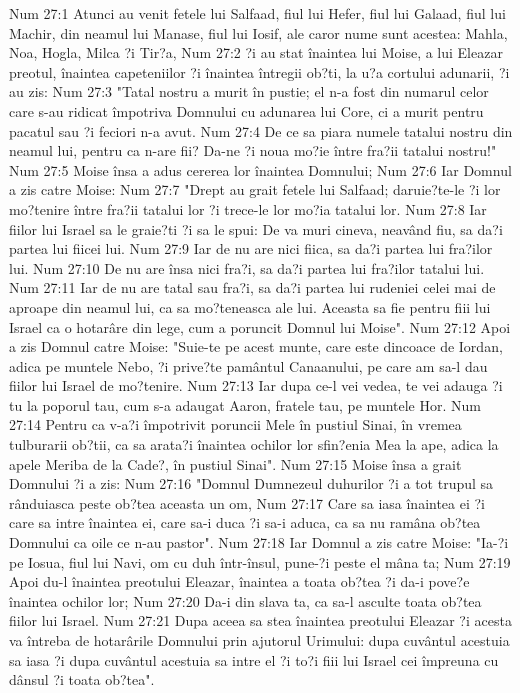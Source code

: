 Num 27:1  Atunci au venit fetele lui Salfaad, fiul lui Hefer, fiul lui Galaad, fiul lui Machir, din neamul lui Manase, fiul lui Iosif, ale caror nume sunt acestea: Mahla, Noa, Hogla, Milca ?i Tir?a,
Num 27:2  ?i au stat înaintea lui Moise, a lui Eleazar preotul, înaintea capeteniilor ?i înaintea întregii ob?ti, la u?a cortului adunarii, ?i au zis:
Num 27:3  "Tatal nostru a murit în pustie; el n-a fost din numarul celor care s-au ridicat împotriva Domnului cu adunarea lui Core, ci a murit pentru pacatul sau ?i feciori n-a avut.
Num 27:4  De ce sa piara numele tatalui nostru din neamul lui, pentru ca n-are fii? Da-ne ?i noua mo?ie între fra?ii tatalui nostru!"
Num 27:5  Moise însa a adus cererea lor înaintea Domnului;
Num 27:6  Iar Domnul a zis catre Moise:
Num 27:7  "Drept au grait fetele lui Salfaad; daruie?te-le ?i lor mo?tenire între fra?ii tatalui lor ?i trece-le lor mo?ia tatalui lor.
Num 27:8  Iar fiilor lui Israel sa le graie?ti ?i sa le spui: De va muri cineva, neavând fiu, sa da?i partea lui fiicei lui.
Num 27:9  Iar de nu are nici fiica, sa da?i partea lui fra?ilor lui.
Num 27:10  De nu are însa nici fra?i, sa da?i partea lui fra?ilor tatalui lui.
Num 27:11  Iar de nu are tatal sau fra?i, sa da?i partea lui rudeniei celei mai de aproape din neamul lui, ca sa mo?teneasca ale lui. Aceasta sa fie pentru fiii lui Israel ca o hotarâre din lege, cum a poruncit Domnul lui Moise".
Num 27:12  Apoi a zis Domnul catre Moise: "Suie-te pe acest munte, care este dincoace de Iordan, adica pe muntele Nebo, ?i prive?te pamântul Canaanului, pe care am sa-l dau fiilor lui Israel de mo?tenire.
Num 27:13  Iar dupa ce-l vei vedea, te vei adauga ?i tu la poporul tau, cum s-a adaugat Aaron, fratele tau, pe muntele Hor.
Num 27:14  Pentru ca v-a?i împotrivit poruncii Mele în pustiul Sinai, în vremea tulburarii ob?tii, ca sa arata?i înaintea ochilor lor sfin?enia Mea la ape, adica la apele Meriba de la Cade?, în pustiul Sinai".
Num 27:15  Moise însa a grait Domnului ?i a zis:
Num 27:16  "Domnul Dumnezeul duhurilor ?i a tot trupul sa rânduiasca peste ob?tea aceasta un om,
Num 27:17  Care sa iasa înaintea ei ?i care sa intre înaintea ei, care sa-i duca ?i sa-i aduca, ca sa nu ramâna ob?tea Domnului ca oile ce n-au pastor".
Num 27:18  Iar Domnul a zis catre Moise: "Ia-?i pe Iosua, fiul lui Navi, om cu duh într-însul, pune-?i peste el mâna ta;
Num 27:19  Apoi du-l înaintea preotului Eleazar, înaintea a toata ob?tea ?i da-i pove?e înaintea ochilor lor;
Num 27:20  Da-i din slava ta, ca sa-l asculte toata ob?tea fiilor lui Israel.
Num 27:21  Dupa aceea sa stea înaintea preotului Eleazar ?i acesta va întreba de hotarârile Domnului prin ajutorul Urimului: dupa cuvântul acestuia sa iasa ?i dupa cuvântul acestuia sa intre el ?i to?i fiii lui Israel cei împreuna cu dânsul ?i toata ob?tea".
